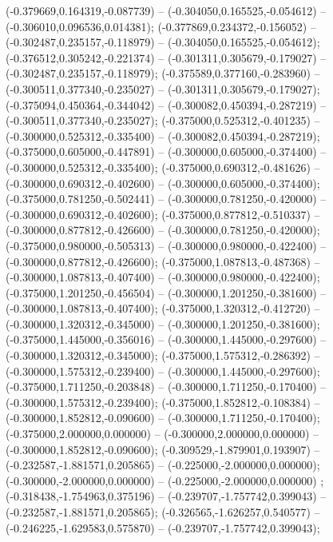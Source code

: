  (-0.379669,0.164319,-0.087739) -- (-0.304050,0.165525,-0.054612) -- (-0.306010,0.096536,0.014381);
 (-0.377869,0.234372,-0.156052) -- (-0.302487,0.235157,-0.118979) -- (-0.304050,0.165525,-0.054612);
 (-0.376512,0.305242,-0.221374) -- (-0.301311,0.305679,-0.179027) -- (-0.302487,0.235157,-0.118979);
 (-0.375589,0.377160,-0.283960) -- (-0.300511,0.377340,-0.235027) -- (-0.301311,0.305679,-0.179027);
 (-0.375094,0.450364,-0.344042) -- (-0.300082,0.450394,-0.287219) -- (-0.300511,0.377340,-0.235027);
 (-0.375000,0.525312,-0.401235) -- (-0.300000,0.525312,-0.335400) -- (-0.300082,0.450394,-0.287219);
 (-0.375000,0.605000,-0.447891) -- (-0.300000,0.605000,-0.374400) -- (-0.300000,0.525312,-0.335400);
 (-0.375000,0.690312,-0.481626) -- (-0.300000,0.690312,-0.402600) -- (-0.300000,0.605000,-0.374400);
 (-0.375000,0.781250,-0.502441) -- (-0.300000,0.781250,-0.420000) -- (-0.300000,0.690312,-0.402600);
 (-0.375000,0.877812,-0.510337) -- (-0.300000,0.877812,-0.426600) -- (-0.300000,0.781250,-0.420000);
 (-0.375000,0.980000,-0.505313) -- (-0.300000,0.980000,-0.422400) -- (-0.300000,0.877812,-0.426600);
 (-0.375000,1.087813,-0.487368) -- (-0.300000,1.087813,-0.407400) -- (-0.300000,0.980000,-0.422400);
 (-0.375000,1.201250,-0.456504) -- (-0.300000,1.201250,-0.381600) -- (-0.300000,1.087813,-0.407400);
 (-0.375000,1.320312,-0.412720) -- (-0.300000,1.320312,-0.345000) -- (-0.300000,1.201250,-0.381600);
 (-0.375000,1.445000,-0.356016) -- (-0.300000,1.445000,-0.297600) -- (-0.300000,1.320312,-0.345000);
 (-0.375000,1.575312,-0.286392) -- (-0.300000,1.575312,-0.239400) -- (-0.300000,1.445000,-0.297600);
 (-0.375000,1.711250,-0.203848) -- (-0.300000,1.711250,-0.170400) -- (-0.300000,1.575312,-0.239400);
 (-0.375000,1.852812,-0.108384) -- (-0.300000,1.852812,-0.090600) -- (-0.300000,1.711250,-0.170400);
 (-0.375000,2.000000,0.000000) -- (-0.300000,2.000000,0.000000) -- (-0.300000,1.852812,-0.090600);
 (-0.309529,-1.879901,0.193907) -- (-0.232587,-1.881571,0.205865) -- (-0.225000,-2.000000,0.000000);
 (-0.300000,-2.000000,0.000000) -- (-0.225000,-2.000000,0.000000) ;
 (-0.318438,-1.754963,0.375196) -- (-0.239707,-1.757742,0.399043) -- (-0.232587,-1.881571,0.205865);
 (-0.326565,-1.626257,0.540577) -- (-0.246225,-1.629583,0.575870) -- (-0.239707,-1.757742,0.399043);
